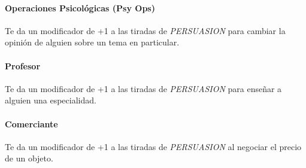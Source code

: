     \paragraph{Operaciones Psicológicas (Psy Ops)}
    Te da un modificador de +1 a las tiradas de \emph{PERSUASION} para cambiar la opinión de alguien sobre un tema en particular.

    \paragraph{Profesor}
    Te da un modificador de +1 a las tiradas de \emph{PERSUASION} para enseñar a alguien una especialidad.

    \paragraph{Comerciante}
    Te da un modificador de +1 a las tiradas de \emph{PERSUASION} al negociar el precio de un objeto.